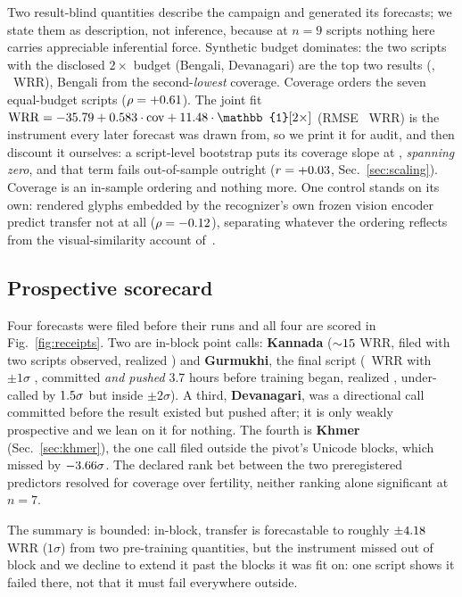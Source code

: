 Two result-blind quantities describe the campaign and generated its forecasts; we state them as
description, not inference, because at $n=9$ scripts nothing here carries appreciable inferential
force. Synthetic budget dominates: the two scripts with the disclosed $2\times$ budget (Bengali,
Devanagari) are the top two results (\wrrBbengali, \wrrBdevanagari\ WRR), Bengali from the
second-\emph{lowest} coverage. Coverage orders the seven equal-budget scripts
($\rho=+0.61$). The joint fit
$\mathrm{WRR} = \tfIntercept + \tfCovCoef\cdot\mathrm{cov} + \tfTwoxBonus\cdot\mathbb{1}[2\times]$
(RMSE \tfRMSE\ WRR) is the instrument every later forecast was drawn from, so we print it for
audit, and then discount it ourselves: a script-level bootstrap puts its coverage slope at
\ciTfCov, \emph{spanning zero}, and that term fails out-of-sample outright ($r=+0.03$,
Sec.~\ref{sec:scaling}). Coverage is an in-sample ordering and nothing more. One control stands on
its own: rendered glyphs embedded by the recognizer's own frozen vision encoder predict transfer
not at all ($\rho=-0.12$), separating whatever the ordering reflects from the
visual-similarity account of~\cite{crosslingstr}.

\subsection{Prospective scorecard}
\label{sec:scorecard}

Four forecasts were filed before their runs and all four are scored in
Fig.~\ref{fig:receipts}. Two are in-block point calls: \textbf{Kannada} (${\sim}15$ WRR, filed
with two scripts observed, realized \realKannada) and \textbf{Gurmukhi}, the final script
(\predGurmukhi\ WRR with $\pm1\sigma$ \predGurmukhiOneSig, committed \emph{and pushed} 3.7 hours
before training began, realized \realGurmukhi, under-called by $1.5\sigma$ but inside
$\pm2\sigma$). A third, \textbf{Devanagari}, was a directional call committed before the result
existed but pushed after; it is only weakly prospective and we lean on it for nothing. The fourth
is \textbf{Khmer} (Sec.~\ref{sec:khmer}), the one call filed outside the pivot's Unicode blocks,
which missed by $-3.66\sigma$. The declared rank bet between the two preregistered
predictors resolved for coverage over fertility, neither ranking alone significant at $n=7$.

The summary is bounded: in-block, transfer is forecastable to roughly $\pm4.18$ WRR
($1\sigma$) from two pre-training quantities, but the instrument missed out of block and we decline
to extend it past the blocks it was fit on: one script shows it failed there, not that it must
fail everywhere outside.
